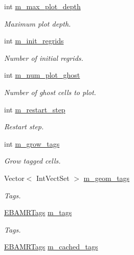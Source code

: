 \begin{DoxyCompactItemize}
int \hyperlink{classplasma__engine_ad3a3fcecf93110523dee8e00b517e801}{m\+\_\+max\+\_\+plot\+\_\+depth}
\begin{DoxyCompactList}\small\item\em Maximum plot depth. \end{DoxyCompactList}\item 
int \hyperlink{classplasma__engine_abcf41488b5025036ef0ea7628c51335a}{m\+\_\+init\+\_\+regrids}
\begin{DoxyCompactList}\small\item\em Number of initial regrids. \end{DoxyCompactList}\item 
int \hyperlink{classplasma__engine_a2afdfef0059dc396540d1da383358474}{m\+\_\+num\+\_\+plot\+\_\+ghost}
\begin{DoxyCompactList}\small\item\em Number of ghost cells to plot. \end{DoxyCompactList}\item 
int \hyperlink{classplasma__engine_a7323b9b5c2fd0bbb24b6ed7025054abe}{m\+\_\+restart\+\_\+step}
\begin{DoxyCompactList}\small\item\em Restart step. \end{DoxyCompactList}\item 
int \hyperlink{classplasma__engine_a7710549e3587cbc4f27690370d22a7fb}{m\+\_\+grow\+\_\+tags}
\begin{DoxyCompactList}\small\item\em Grow tagged cells. \end{DoxyCompactList}\item 
Vector$<$ Int\+Vect\+Set $>$ \hyperlink{classplasma__engine_a1a1df7d26332af8f1b3407faa3276ed5}{m\+\_\+geom\+\_\+tags}
\begin{DoxyCompactList}\small\item\em Tags. \end{DoxyCompactList}\item 
\hyperlink{type__definitions_8H_a4eb540da9eb275c3e4225830ae526113}{E\+B\+A\+M\+R\+Tags} \hyperlink{classplasma__engine_afc8dad643656a8476b83195aab88cddb}{m\+\_\+tags}
\begin{DoxyCompactList}\small\item\em Tags. \end{DoxyCompactList}\item 
\hyperlink{type__definitions_8H_a4eb540da9eb275c3e4225830ae526113}{E\+B\+A\+M\+R\+Tags} \hyperlink{classplasma__engine_a8fd339d48f37250240744ea9bd878a42}{m\+\_\+cached\+\_\+tags}

\end{DoxyCompactItemize}
